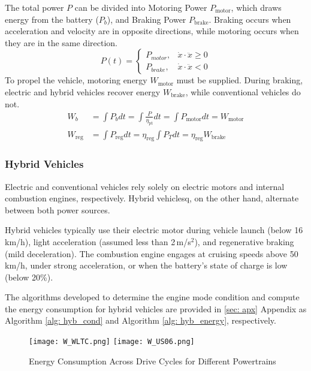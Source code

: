 	The total power $P$ can be divided into Motoring Power $P_{\text{motor}}$, which draws energy from the battery ($P_b$), and Braking Power $P_{\text{brake}}$. Braking occurs when acceleration and velocity are in opposite directions, while motoring occurs when they are in the same direction.
	\begin{equation*}
		P(t) = \left\{  
			\begin{array}{cc} 
				P_{motor},  & \dot x \cdot \ddot x \geq 0 \\
				P_{brake},  & \dot x \cdot \ddot x < 0  
			\end{array} \right.
	\end{equation*}
	To propel the vehicle, motoring energy $W_{\text{motor}}$ must be supplied. During braking, electric and hybrid vehicles recover energy $W_{\text{brake}}$, while conventional vehicles do not.
	\begin{align*}
		W_b & = \int P_{b} dt = \int \frac{P}{\eta_{\text{pt}}}dt = \int P_{\text{motor}} dt = W_{\text{motor}}\\
		W_{\text{reg}} & = \int P_{\text{reg}} dt =\eta_{\text{reg}}\int P_{T} dt = \eta_{\text{reg}} W_{\text{brake}} 
	\end{align*}
\subsubsection*{Hybrid Vehicles}
	Electric and conventional vehicles rely solely on electric motors and internal combustion engines, respectively. Hybrid vehiclesq, on the other hand, alternate between both power sources.
	
	Hybrid vehicles typically use their electric motor during vehicle launch (below 16 km/h), light acceleration (assumed less than 2 m/s$^2$), and regenerative braking (mild deceleration). The combustion engine engages at cruising speeds above 50 km/h, under strong acceleration, or when the battery’s state of charge is low (below 20\%). \cite{burke2000lesson}

	The algorithms developed to determine the engine mode condition and compute the energy consumption for hybrid vehicles are provided in \ref{sec: apx} Appendix as Algorithm \ref{alg: hyb_cond} and Algorithm \ref{alg: hyb_energy}, respectively.

	\begin{figure}[H]
		\begin{center}
			\texttt{[image: W\_WLTC.png]}
			\texttt{[image: W\_US06.png]}
		\end{center}
		\caption{Energy Consumption Across Drive Cycles for Different Powertrains}
	\end{figure}
		
